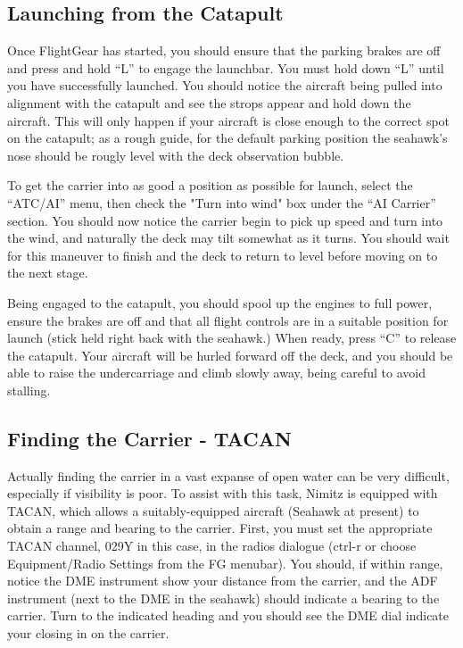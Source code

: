 \subsection{Launching from the Catapult}

Once FlightGear has started, you should ensure that the parking brakes are off and press and hold ``L'' to 
engage the launchbar. You must hold down ``L'' until you have successfully launched. 
You should notice the aircraft being pulled into alignment with the catapult and see 
the strops appear and hold down the aircraft.  This will only happen if your aircraft is 
close enough to the correct spot on the catapult; as a rough guide, for the default 
parking position the seahawk's nose should be rougly level with the deck observation bubble.

To get the carrier into as good a position as possible for launch, select the ``ATC/AI'' menu, then 
check the "Turn into wind" box under the ``AI Carrier'' section. You should now notice the carrier 
begin to pick up speed and turn into the wind, and naturally the deck may tilt somewhat as it turns. 
You should wait for this maneuver to finish and the deck to return to level before moving on to the next stage.

Being engaged to the catapult, you should spool up the engines to full power, ensure the brakes are off 
and that all flight controls are in a suitable position for launch (stick held right back with the seahawk.)  
When ready, press ``C'' to release the catapult. Your aircraft will be hurled forward off the deck, and 
you should be able to raise the undercarriage and climb slowly away, being careful to avoid stalling.

\subsection{Finding the Carrier - TACAN}

Actually finding the carrier in a vast expanse of open water can be very difficult, especially if visibility 
is poor. To assist with this task, Nimitz is equipped with TACAN, which allows a suitably-equipped 
aircraft (Seahawk at present) to obtain a range and bearing to the carrier. First, you must set 
the appropriate TACAN channel, 029Y in this case, in the radios dialogue (ctrl-r or choose 
Equipment/Radio Settings from the FG menubar). You should, if within range, notice the DME instrument 
show your distance from the carrier, and the ADF instrument (next to the DME in the seahawk) should 
indicate a bearing to the carrier. Turn to the indicated heading and you should see the DME dial 
indicate your closing in on the carrier.


